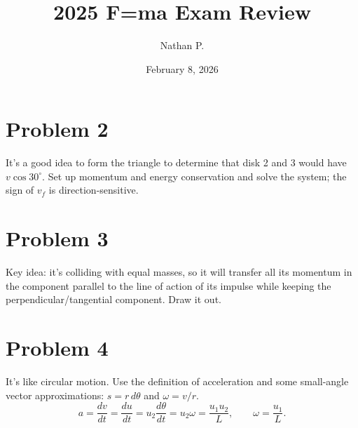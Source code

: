 \documentclass[11pt]{article}
\title{2025 F=ma Exam Review}
\author{Nathan P.}
\date{February 8, 2026}
\begin{document}
\maketitle

\section*{Problem 2}
It’s a good idea to form the triangle to determine that disk 2 and 3 would have $v\cos 30^\circ$.
Set up momentum and energy conservation and solve the system; the sign of $v_f$ is direction-sensitive.

\begin{center}
\end{center}

\section*{Problem 3}
Key idea: it’s colliding with equal masses, so it will transfer all its momentum in the component parallel to the line of action of its impulse while keeping the perpendicular/tangential component.
Draw it out.

\section*{Problem 4}
It’s like circular motion. Use the definition of acceleration and some small-angle vector approximations: $s=r\,d\theta$ and $\omega=v/r$.
\[
a=\frac{dv}{dt}=\frac{du}{dt}=u_2\frac{d\theta}{dt}=u_2\omega=\frac{u_1u_2}{L},
\qquad
\omega=\frac{u_1}{L}.
\]
\end{document}
